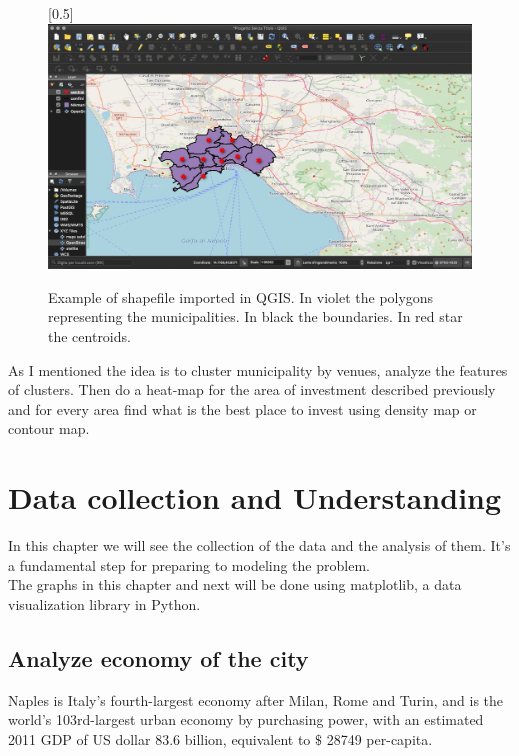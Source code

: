\documentclass[a4paper, 12pt, oneside]{book}
\begin{document}
\begin{figure}[!htb]
		\centering
		\scalebox{0.3}[0.5]{\includegraphics{immagini/qgis_boundaries.jpg}}
		\caption{Example of shapefile imported in QGIS. In violet the polygons representing the municipalities. In black the boundaries. In red star the centroids. }
		\label{fig:qgis_boundaries}
	\end{figure}



 As I mentioned the idea is to cluster municipality by venues, analyze the features of clusters. Then do a heat-map for the area of investment described previously and for every area find what is the best place to invest using density map or contour map.

\chapter*{Data collection and Understanding}
\label{ch:dataCollection}
In this chapter we will see the collection of the data and the analysis of them. It's a fundamental step for preparing to modeling the problem.\\
 
The graphs in this chapter and next will be done using matplotlib, a data visualization library in Python.

\section*{Analyze economy of the city} 
\label{sec:economy_city}
Naples is Italy's fourth-largest economy after Milan, Rome and Turin, and is the world's 103rd-largest urban economy by purchasing power, with an estimated 2011 GDP of US dollar 83.6 billion, equivalent to $\$$ 28749 per-capita. 
\end{document}
